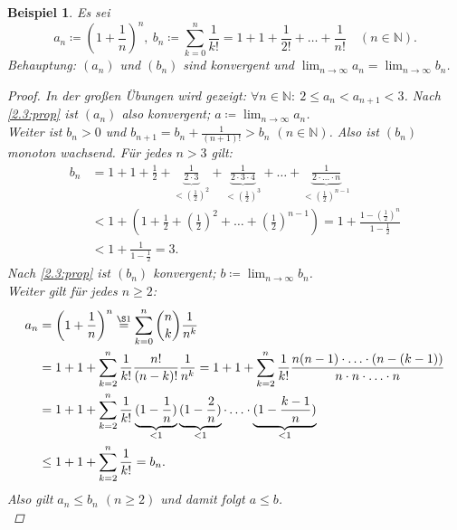 \documentclass[12pt]{extreport} %
\newcommand{\N}{\mathbb{N}}
\theoremstyle{named}
\theoremstyle{itshape}
\theoremstyle{normal}
\newtheorem{beispiel}[unnamedtheorem]{Beispiel}
\begin{document}
\begin{beispiel} \label{2.9:bsp}
	Es sei 
	$$a_{n} \coloneqq \left( 1 + \frac{1}{n} \right)^{n}, ~ b_{n} \coloneqq \sum_{k = 0}^{n} \frac{1}{k!} = 1 + 1 + \frac{1}{2!} + \dotsc + \frac{1}{n!} \quad (n \in \N).$$
	Behauptung: $(a_{n})$ und $(b_{n})$ sind konvergent und $\lim_{n \to \infty} a_{n} = \lim_{n \to \infty}  b_{n}$.
	
	\begin{proof}
		In der großen Übungen wird gezeigt: $\forall n \in \N: ~ 2 \leq a_{n} < a_{n+1} < 3$. Nach \ref{2.3:prop} ist $(a_n)$ also konvergent; 
		$a \coloneqq \lim_{n \to \infty} a_{n}$. \\
		Weiter ist $b_{n} > 0$ und $b_{n+1} = b_{n} + \frac{1}{(n+1)!} > b_{n}$ $(n \in \N)$. Also ist $(b_{n})$ monoton wachsend. Für jedes $n > 3$ gilt:
		\begin{align*} 
			b_{n} & = 1 + 1 + \frac{1}{2} + \underbrace{\frac{1}{2 \cdot 3}}_{< \left(\frac{1}{2}\right)^{2}} + \underbrace{\frac{1}{2 \cdot 3 \cdot 4}}_{< 
			\left(\frac{1}{2}\right)^{3}} + \dotsc + \underbrace{\frac{1}{2 \cdot \dotsc \cdot n}}_{< \left(\frac{1}{2}\right)^{n-1}} \\
			& < 1 + \left( 1 + \frac{1}{2} + \left(\frac{1}{2}\right)^{2} + \dotsc + \left(\frac{1}{2}\right)^{n-1} \right) 
			= 1 + \frac{1 - \left( \frac{1}{2} \right)^{n}}{1 - \frac{1}{2}} \\
			& < 1 + \frac{1}{1 - \frac{1}{2}} = 3.
		\end{align*} 
		Nach \ref{2.3:prop} ist $(b_{n})$ konvergent; $b \coloneqq \lim_{n \to \infty} b_{n}$. \\
		Weiter gilt für jedes $n \geq 2$:
		\begin{align*}
			a_{n} & = \left( 1 + \frac{1}{n} \right)^{n} \overset{\S 1}{=} \sum_{k=0}^{n} \binom{n}{k} \frac{1}{n^{k}} \\
				  & = 1 + 1 + \sum_{k = 2}^{n} \frac{1}{k!} \frac{n!}{(n-k)!} \frac{1}{n^{k}} 
				  = 1 + 1 + \sum_{k=2}^{n} \frac{1}{k!} \frac{n(n-1) \cdot \dotsc \cdot (n-(k-1))}{n \cdot n \cdot \dotsc \cdot n} \\
				  & = 1 + 1 + \sum_{k=2}^{n} \frac{1}{k!} \underbrace{(1 - \frac{1}{n})}_{< 1} \underbrace{(1 - \frac{2}{n})}_{< 1} \cdot \dotsc \cdot 
				  \underbrace{(1 - \frac{k-1}{n})}_{< 1} \\
				  & \leq 1 + 1 + \sum_{k=2}^{n} \frac{1}{k!} = b_{n}.
		\end{align*}
		Also gilt $a_{n} \leq b_{n}$ $(n \geq 2)$ und damit folgt $a \leq b$. \\

\end{proof}
\end{beispiel}
\end{document}
